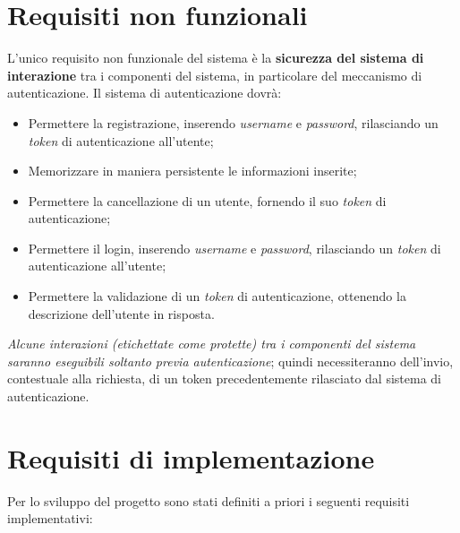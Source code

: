 \section{Requisiti non funzionali}
L'unico requisito non funzionale del sistema è la \textbf{sicurezza del sistema di interazione} tra i componenti del sistema, in particolare del meccanismo di autenticazione. Il sistema di autenticazione dovrà:
    \begin{itemize}
        \item Permettere la registrazione, inserendo \textit{username} e \textit{password}, 	rilasciando un \textit{token} di autenticazione all'utente;
        \item Memorizzare in maniera persistente le informazioni inserite;
        \item Permettere la cancellazione di un utente, fornendo il suo \textit{token} di autenticazione;
        \item Permettere il login, inserendo \textit{username} e \textit{password}, rilasciando un \textit{token} di autenticazione all'utente;
        \item Permettere la validazione di un \textit{token} di autenticazione, ottenendo la descrizione dell'utente in risposta.
    \end{itemize}
\textit{Alcune interazioni (etichettate come protette) tra i componenti del sistema saranno eseguibili soltanto previa autenticazione}; quindi necessiteranno dell'invio, contestuale alla richiesta, di un token precedentemente rilasciato dal sistema di autenticazione.

\section{Requisiti di implementazione}
Per lo sviluppo del progetto sono stati definiti a priori i seguenti requisiti implementativi:

